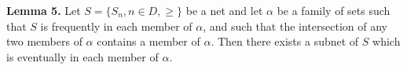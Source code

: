 \textbf{Lemma 5.} Let $S = \{S_n, n \in D, \geq\}$ be a net and let $\alpha$ be a family of sets such that $S$ is frequently in each member of $\alpha$, and such that the intersection of any two members of $\alpha$ contains a member of $\alpha$. Then there exists a subnet of $S$ which is eventually in each member of $\alpha$.
